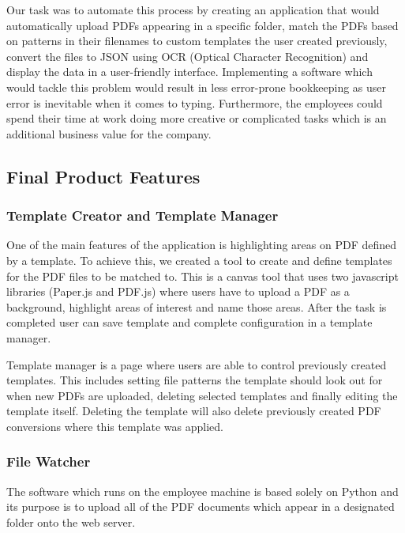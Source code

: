 \documentclass{l3proj}
\begin{document}
Our task was to automate this process by creating an application that would automatically upload PDFs appearing in a specific folder, match the PDFs based on patterns in their filenames to custom templates the user created previously, convert the files to JSON using OCR (Optical Character Recognition) and display the data in a user-friendly interface.
Implementing a software which would tackle this problem would result in less error-prone bookkeeping as user error is inevitable when it comes to typing. Furthermore, the employees could spend their time at work doing more creative or complicated tasks which is an additional business value for the company.


\subsection{Final Product Features}
\subsubsection{Template Creator and Template Manager}

One of the main features of the application is highlighting areas on PDF defined by a template. To achieve this, we created a tool to create and define templates for the PDF files to be matched to. This is a canvas tool that uses two javascript libraries (Paper.js and PDF.js) where users have to upload a PDF as a background, highlight areas of interest and name those areas. After the task is completed user can save template and complete configuration in a template manager.

Template manager is a page where users are able to control previously created templates. This includes setting file patterns the template should look out for when new PDFs are uploaded, deleting selected templates and finally editing the template itself. Deleting the template will also delete previously created PDF conversions where this template was applied.


\subsubsection{File Watcher}

The software which runs on the employee machine is based solely on Python and its purpose is to upload all of the PDF documents which appear in a designated folder onto the web server.
\end{document}
